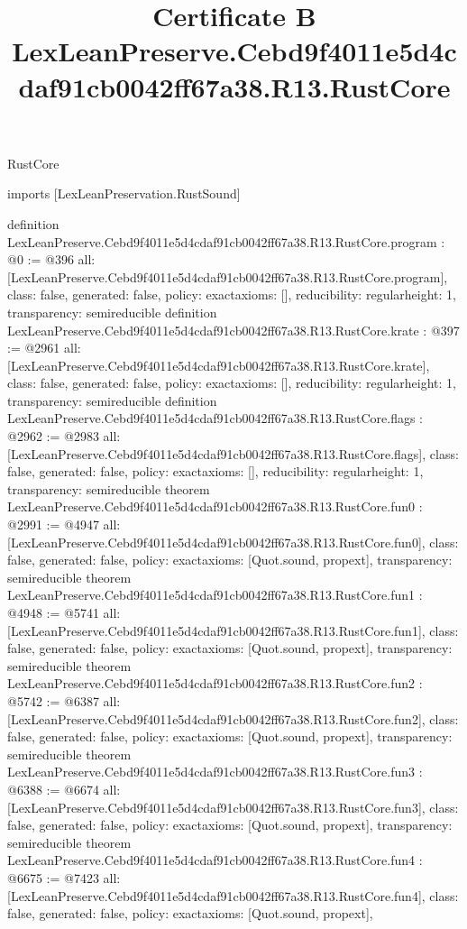 \begin{lexlean}{RustCore}
\title{Certificate B LexLeanPreserve.Cebd9f4011e5d4cdaf91cb0042ff67a38.R13.RustCore}
\begin{coremodule}
imports [LexLeanPreservation.RustSound]

definition LexLeanPreserve.Cebd9f4011e5d4cdaf91cb0042ff67a38.R13.RustCore.program : @0 := @396 {
  all: [LexLeanPreserve.Cebd9f4011e5d4cdaf91cb0042ff67a38.R13.RustCore.program],
  class: false,
  generated: false,
  policy: exact{axioms: []},
  reducibility: regular{height: 1},
  transparency: semireducible
}
definition LexLeanPreserve.Cebd9f4011e5d4cdaf91cb0042ff67a38.R13.RustCore.krate : @397 := @2961 {
  all: [LexLeanPreserve.Cebd9f4011e5d4cdaf91cb0042ff67a38.R13.RustCore.krate],
  class: false,
  generated: false,
  policy: exact{axioms: []},
  reducibility: regular{height: 1},
  transparency: semireducible
}
definition LexLeanPreserve.Cebd9f4011e5d4cdaf91cb0042ff67a38.R13.RustCore.flags : @2962 := @2983 {
  all: [LexLeanPreserve.Cebd9f4011e5d4cdaf91cb0042ff67a38.R13.RustCore.flags],
  class: false,
  generated: false,
  policy: exact{axioms: []},
  reducibility: regular{height: 1},
  transparency: semireducible
}
theorem LexLeanPreserve.Cebd9f4011e5d4cdaf91cb0042ff67a38.R13.RustCore.fun0 : @2991 := @4947 {
  all: [LexLeanPreserve.Cebd9f4011e5d4cdaf91cb0042ff67a38.R13.RustCore.fun0],
  class: false,
  generated: false,
  policy: exact{axioms: [Quot.sound, propext]},
  transparency: semireducible
}
theorem LexLeanPreserve.Cebd9f4011e5d4cdaf91cb0042ff67a38.R13.RustCore.fun1 : @4948 := @5741 {
  all: [LexLeanPreserve.Cebd9f4011e5d4cdaf91cb0042ff67a38.R13.RustCore.fun1],
  class: false,
  generated: false,
  policy: exact{axioms: [Quot.sound, propext]},
  transparency: semireducible
}
theorem LexLeanPreserve.Cebd9f4011e5d4cdaf91cb0042ff67a38.R13.RustCore.fun2 : @5742 := @6387 {
  all: [LexLeanPreserve.Cebd9f4011e5d4cdaf91cb0042ff67a38.R13.RustCore.fun2],
  class: false,
  generated: false,
  policy: exact{axioms: [Quot.sound, propext]},
  transparency: semireducible
}
theorem LexLeanPreserve.Cebd9f4011e5d4cdaf91cb0042ff67a38.R13.RustCore.fun3 : @6388 := @6674 {
  all: [LexLeanPreserve.Cebd9f4011e5d4cdaf91cb0042ff67a38.R13.RustCore.fun3],
  class: false,
  generated: false,
  policy: exact{axioms: [Quot.sound, propext]},
  transparency: semireducible
}
theorem LexLeanPreserve.Cebd9f4011e5d4cdaf91cb0042ff67a38.R13.RustCore.fun4 : @6675 := @7423 {
  all: [LexLeanPreserve.Cebd9f4011e5d4cdaf91cb0042ff67a38.R13.RustCore.fun4],
  class: false,
  generated: false,
  policy: exact{axioms: [Quot.sound, propext]},
}
\end{coremodule}
\end{lexlean}
